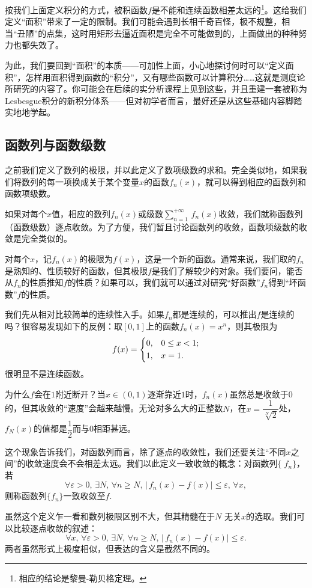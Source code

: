 按我们上面定义积分的方式，被积函数$f$是不能和连续函数相差太远的\footnote{相应的结论是黎曼-勒贝格定理。}。这给我们定义“面积”带来了一定的限制。我们可能会遇到长相千奇百怪，极不规整，相当“丑陋”的点集，这时用矩形去逼近面积是完全不可能做到的，上面做出的种种努力也都失效了。

为此，我们要回到“面积”的本质——可加性上面，小心地探讨何时可以“定义面积”，怎样用面积得到函数的“积分”，又有哪些函数可以计算积分……这就是测度论所研究的内容了。你可能会在后续的实分析课程上见到这些，并且重建一套被称为Lesbesgue积分的新积分体系——但对初学者而言，最好还是从这些基础内容脚踏实地地学起。
\subsection{函数列与函数级数}
之前我们定义了数列的极限，并以此定义了数项级数的求和。完全类似地，如果我们将数列的每一项换成关于某个变量$x$的函数$f_n(x)$，就可以得到相应的函数列和函数项级数。

如果对每个$x$值，相应的数列$f_n(x)$或级数$\sum_{n=1}^{+\infty}\,f_n(x)$收敛，我们就称函数列（函数级数）逐点收敛。为了方便，我们暂且讨论函数列的收敛，函数项级数的收敛是完全类似的。

对每个$x$，记$f_n(x)$的极限为$f(x)$，这是一个新的函数。通常来说，我们取的$f_n$是熟知的、性质较好的函数，但其极限$f$是我们了解较少的对象。我们要问，能否从$f_n$的性质推知$f$的性质？如果可以，我们就可以通过对研究“好函数”$f_n$得到“坏函数”$f$的性质。

我们先从相对比较简单的连续性入手。如果$f_n$都是连续的，可以推出$f$是连续的吗？很容易发现如下的反例：取$[0,1]$上的函数$f_n(x)=x^n$，则其极限为
\[f(x)=
    \begin{dcases}
        0, & 0\leq x< 1; \\
        1, & x=1.
    \end{dcases}
\]
很明显不是连续函数。

为什么$f$会在$1$附近断开？当$x\in(0,1)$逐渐靠近$1$时，$f_n(x)$虽然总是收敛于$0$的，但其收敛的“速度”会越来越慢。无论对多么大的正整数$N$，在$x=\dfrac {1}{\sqrt[N]{2}}$处，$f_N(x)$的值都是$\dfrac 12$而与$0$相距甚远。

这个现象告诉我们，对函数列而言，除了逐点的收敛性，我们还要关注“不同$x$之间”的收敛速度会不会相差太远。我们以此定义一致收敛的概念：对函数列$\{\;\!f_n\}$，若
\[\forall \varepsilon>0,\,\exists N,\,\forall n\geq N,\,\bigl|\,f_n(x)-f(x)\bigr|\leq \varepsilon,\,\forall x,\]
则称函数列$\{f_n\}$一致收敛至$f$.

虽然这个定义乍一看和数列极限区别不大，但其精髓在于$N$ 无关$x$的选取。我们可以比较逐点收敛的叙述：
\[\forall x,\,\forall \varepsilon>0,\,\exists N,\,\forall n\geq N,\,|\,f_n(x)-f(x)|\leq \varepsilon.\]
两者虽然形式上极度相似，但表达的含义是截然不同的。

